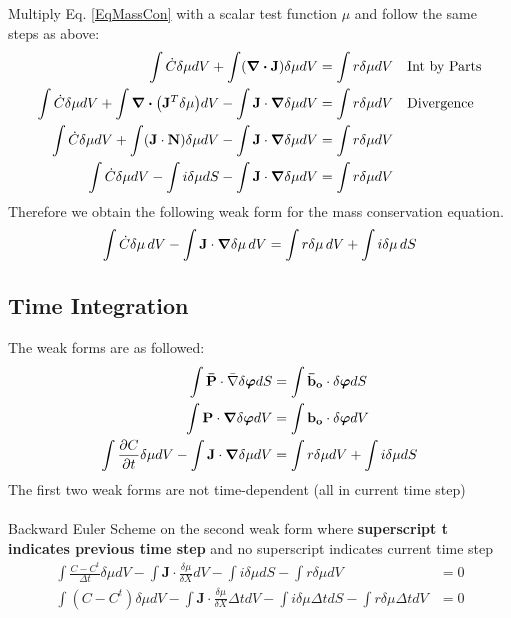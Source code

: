 \documentclass[12pt,3p]{article}
\numberwithin{equation}{section}
\begin{document}
Multiply Eq. \ref{EqMassCon} with a scalar test function $\mu$ and follow the same steps as above: 
\begin{align*}
\int {\dot{C}} \delta \mu dV + \int ( \div \mathbf{J}) \delta \mu dV &= \int r \delta \mu dV \quad \text{Int by Parts} \\ 
\int {\dot{C}} \delta \mu dV + \int \div (\mathbf{J}^T \delta \mu) dV - \int \mathbf{J} \cdot \grad \delta \mu dV &= \int r \delta \mu dV \quad \text{Divergence} \\
 \int {\dot{C}} \delta \mu dV + \int (\mathbf{J} \cdot \mathbf{N}) \delta \mu dV - \int \mathbf{J} \cdot \grad \delta \mu dV &= \int r \delta \mu dV \\
 \int {\dot{C}} \delta \mu dV - \int i \delta \mu dS - \int \mathbf{J} \cdot \grad \delta \mu dV &= \int r \delta \mu dV 
\end{align*}
Therefore we obtain the following weak form for the mass conservation equation.
\begin{equation}\label{EqMassConWeakForm}
 \int {\dot{C}} \delta \mu \, dV - \int \mathbf{J} \cdot \grad \delta \mu \, dV = \int r \delta \mu \, dV + \int i \delta \mu \, dS 
\end{equation}

\subsection{Time Integration}
\vspace{-1ex}
The weak forms are as followed: 
\begin{align*}
\int \mathbf{\bar{P}} \cdot \bar{\nabla} \delta \boldsymbol\varphi dS  &= \int \mathbf{\bar{b}_o} \cdot \delta \boldsymbol\varphi dS \\
\int \mathbf{P} \cdot \grad \delta \boldsymbol\varphi dV &= \int \mathbf{b_o} \cdot \delta \boldsymbol\varphi dV \\
\int \pdv{C}{t} \delta \mu dV - \int \mathbf{J} \cdot \grad \delta \mu dV &= \int r \delta \mu dV + \int i \delta \mu dS 
\end{align*}
The first two weak forms are not time-dependent (all in current time step) \\ \\
Backward Euler Scheme on the second weak form where \textbf{superscript t indicates previous time step} and no superscript indicates current time step
\begin{align*}
\int \frac{C - C^t}{\Delta t} \delta \mu dV - \int \mathbf{J} \cdot \frac{\delta \mu}{\delta X} dV - \int i \delta \mu dS - \int r \delta \mu dV &= 0 \\
\int (C - C^t) \delta \mu dV - \int \mathbf{J} \cdot \frac{\delta \mu}{\delta X} \Delta t dV - \int i \delta \mu \Delta t dS - \int r \delta \mu \Delta t dV &= 0 
\end{align*}
\end{document}
